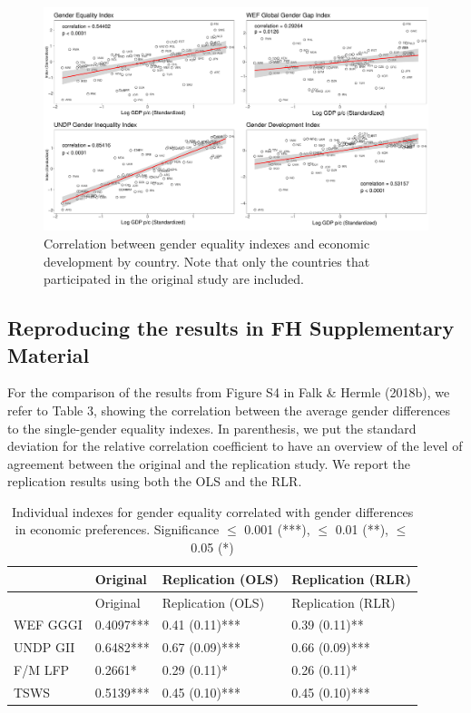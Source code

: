 \documentclass[
]{article}
\begin{document}
\begin{figure}
\centering
\includegraphics{figures/corr_equality_economicdev.pdf}
\caption{Correlation between gender equality indexes and economic
development by country. Note that only the countries that participated
in the original study are included.}
\end{figure}

\hypertarget{reproducing-the-results-in-fh-supplementary-material}{%
\subsection{Reproducing the results in FH Supplementary
Material}\label{reproducing-the-results-in-fh-supplementary-material}}

For the comparison of the results from Figure S4 in Falk \& Hermle
(2018b), we refer to Table 3, showing the correlation between the
average gender differences to the single-gender equality indexes. In
parenthesis, we put the standard deviation for the relative correlation
coefficient to have an overview of the level of agreement between the
original and the replication study. We report the replication results
using both the OLS and the RLR.

\begin{longtable}[]{@{}llll@{}}
\caption{Individual indexes for gender equality correlated with gender
differences in economic preferences. Significance \(\le\) 0.001 (***),
\(\le\) 0.01 (**), \(\le\) 0.05 (*)}\tabularnewline
\toprule()
& Original & Replication (OLS) & Replication (RLR) \\
\midrule()
\endfirsthead
\toprule()
& Original & Replication (OLS) & Replication (RLR) \\
\midrule()
\endhead
WEF GGGI & 0.4097*** & 0.41 (0.11)*** & 0.39 (0.11)** \\
UNDP GII & 0.6482*** & 0.67 (0.09)*** & 0.66 (0.09)*** \\
F/M LFP & 0.2661* & 0.29 (0.11)* & 0.26 (0.11)* \\
TSWS & 0.5139*** & 0.45 (0.10)*** & 0.45 (0.10)*** \\
\bottomrule()
\end{longtable}
\end{document}
